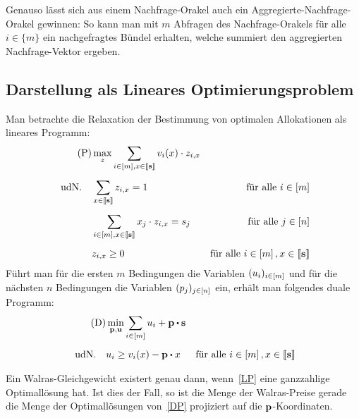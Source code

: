 Genauso lässt sich aus einem Nachfrage-Orakel auch ein Aggregierte-Nachfrage-Orakel gewinnen: So kann man mit $m$ Abfragen des Nachfrage-Orakels für alle $i\in\{m\}$ ein nachgefragtes Bündel erhalten, welche summiert den aggregierten Nachfrage-Vektor ergeben.


\subsection{Darstellung als Lineares Optimierungsproblem}

Man betrachte die Relaxation der Bestimmung von optimalen Allokationen als lineares Programm:
\begin{align*}
	\tag{P}\label{LP}
	&\max_{z} \sum_{i\in\left[ m \right], x\in\left\llbracket \mathbf{s} \right\rrbracket} v_i(x) \cdot z_{i, x} \\[5pt]
	\text{udN.} \quad & \sum_{x\in\left\llbracket \mathbf{s} \right\rrbracket} z_{i, x} = 1 & \text{für alle $i\in\left[ m \right]$}\\[5pt]
	& \sum_{i\in\left[ m \right], x\in\left\llbracket \mathbf{s} \right\rrbracket} x_j \cdot z_{i,x} = s_j & \text{für alle $j\in\left[ n \right]$} \\[5pt]
	& z_{i, x} \geq 0 &\text{für alle $i\in\left[ m \right], x\in\left\llbracket \mathbf{s} \right\rrbracket$}
\end{align*}
Führt man für die ersten $m$ Bedingungen die Variablen $(u_i)_{i\in\left[ m \right]}$ und für die nächsten $n$ Bedingungen die Variablen $(p_j)_{j\in\left[ n \right]}$ ein, erhält man folgendes duale Programm:
\begin{align*}
\tag{D}\label{DP}
&\min_{\fp,\fu} \sum_{i\in\first{m}} u_i + \fp \bcdot \fs \\[5pt]
\text{udN.} \quad &  u_i \geq v_i(x) - \fp \bcdot x & \text{für alle $i\in\first{m}, x\in\ffirst{\fs}$}
\end{align*}
\begin{lemma}
	Ein Walras-Gleichgewicht existert genau dann, wenn~\eqref{LP} eine ganzzahlige Optimallösung hat.
	Ist dies der Fall, so ist die Menge der Walras-Preise gerade die Menge der Optimallösungen von~\eqref{DP} projiziert auf die $\mathbf{p}$-Koordinaten.
\end{lemma}
